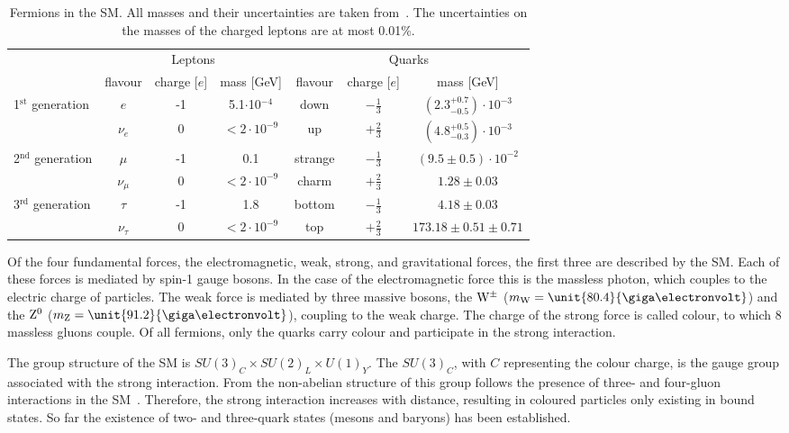 \begin{table}
\centering
 \renewcommand{\arraystretch}{1.3}
\caption{Fermions in the SM. All masses and their uncertainties are taken from~\cite{PDG}. The uncertainties on the masses of the charged leptons are at most 0.01\%.}
\label{tab:fermions}
\begin{tabular}{l|c c c | c c c }
  & \multicolumn{3}{c|}{Leptons} & \multicolumn{3}{c}{Quarks} \\
    & flavour & charge [$e$] & mass [GeV] & flavour & charge [$e$] & mass [GeV] \\
    \hline
  \multirow{2}{*}{1$^{\mathrm{st}}$ generation} & $e$ & -1 & 5.1$\cdot$10$^{\mathrm{-4}}$ &  down & $-\frac{1}{3}$ & $(2.3^{+0.7}_{-0.5})\cdot10^{-3}$ \\
 												& $\nu_e$ & 0 & $<2\cdot10^{-9}$ &  up & $+\frac{2}{3}$ & $(4.8^{+0.5}_{-0.3})\cdot10^{-3}$  \\
 												\hline
  \multirow{2}{*}{2$^{\mathrm{nd}}$ generation} & $\mu$ & -1  & 0.1 & strange & $-\frac{1}{3}$ & $(9.5\pm0.5)\cdot10^{-2}$ \\
 												& $\nu_{\mu}$ & 0 & $<2\cdot10^{-9}$ & charm & $+\frac{2}{3}$ & $1.28\pm0.03$ \\
 												\hline
  \multirow{2}{*}{3$^{\mathrm{rd}}$ generation} & $\tau$ & -1 & 1.8 & bottom & $-\frac{1}{3}$ & $4.18\pm0.03$\\
 												& $\nu_{\tau}$ & 0 & $<2\cdot10^{-9}$ & top & $+\frac{2}{3}$ & $173.18\pm0.51\pm0.71$ \\ 												
 
 
\end{tabular}

\end{table}

Of the four fundamental forces, the electromagnetic, weak, strong, and gravitational forces, the first three are described by the SM. Each of these forces is mediated by spin-1 gauge bosons. In the case of the electromagnetic force this is the massless photon, which couples to the electric charge of particles. The weak force is mediated by three massive bosons, the $\mathrm{W}^{\pm}$ ($m_{\W} = \unit{80.4}{\giga\electronvolt}$) and the $\mathrm{Z}^{0}$ ($m_{\mathrm{Z}} = \unit{91.2}{\giga\electronvolt}$), coupling to the weak charge. The charge of the strong force is called colour, to which 8 massless gluons couple. Of all fermions, only the quarks carry colour and participate in the strong interaction. 

The group structure of the SM is $SU(3)_C \times SU(2)_L \times U(1)_Y$. The $SU(3)_C$, with $C$ representing the colour charge, is the gauge group associated with the strong interaction. From the non-abelian structure of this group follows the presence of three- and four-gluon interactions in the SM~\cite{Pich:2007vu}. Therefore, the strong interaction increases with distance, resulting in coloured particles only existing in bound states. So far the existence of two- and three-quark states (mesons and baryons) has been established. 


